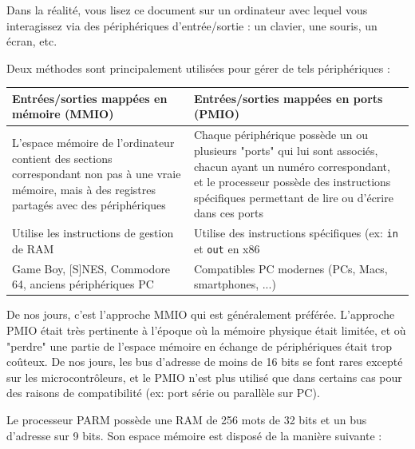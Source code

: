 \documentclass{article}
\begin{document}
    Dans la réalité, vous lisez ce document sur un ordinateur avec lequel vous interagissez via des périphériques d'entrée/sortie : un clavier, une souris, un écran, etc.
    
    Deux méthodes sont principalement utilisées pour gérer de tels périphériques :
    
    \bgroup
    \def\arraystretch{1.5}%
    \begin{tabularx}{\textwidth}{|X|X|}
    	\hline
    	Entrées/sorties mappées en mémoire (MMIO) & Entrées/sorties mappées en ports (PMIO) \\
    	\hline
    	L'espace mémoire de l'ordinateur contient des sections correspondant non pas à une vraie mémoire, mais à des registres partagés avec des périphériques & Chaque périphérique possède un ou plusieurs "ports" qui lui sont associés, chacun ayant un numéro correspondant, et le processeur possède des instructions spécifiques permettant de lire ou d'écrire dans ces ports \\
    	\hline
    	Utilise les instructions de gestion de RAM & Utilise des instructions spécifiques (ex: \texttt{in} et \texttt{out} en x86 \\
    	\hline
    	Game Boy, [S]NES, Commodore 64, anciens périphériques PC & Compatibles PC modernes (PCs, Macs, smartphones, ...) \\
    	\hline
    \end{tabularx}
    \egroup
    
    De nos jours, c'est l'approche MMIO qui est généralement préférée. L'approche PMIO était très pertinente à l'époque où la mémoire physique était limitée, et où "perdre" une partie de l'espace mémoire en échange de périphériques était trop coûteux. De nos jours, les bus d'adresse de moins de 16 bits se font rares excepté sur les microcontrôleurs, et le PMIO n'est plus utilisé que dans certains cas pour des raisons de compatibilité (ex: port série ou parallèle sur PC).
    
    Le processeur PARM possède une RAM de 256 mots de 32 bits et un bus d'adresse sur 9 bits. Son espace mémoire est disposé de la manière suivante :
    
    \newcommand{\memsection}[4]{
		\bytefieldsetup{bitheight=#3\baselineskip}	%
		\bitbox[]{8}{
			\texttt{0x\uppercase{#1}}	 %
			\\ \vspace{#3\baselineskip} \vspace{-2\baselineskip} \vspace{-#3pt} %
			\texttt{0x\uppercase{#2}} %
		}
		\bitbox{16}{#4} %
	}
	
\end{document}
